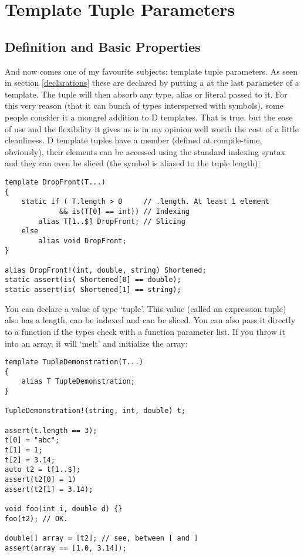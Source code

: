 \section{Template Tuple Parameters}\label{tuples}

\subsection{Definition and Basic Properties}\label{tupleproperties}

And now comes one of my favourite subjects: template tuple parameters. As seen in section \ref{declarations} these are declared by putting a  at the last parameter of a template. The tuple will then absorb any type, alias or literal passed to it. 
For this very reason (that it can bunch of types interspersed with symbols), some people consider it a mongrel addition to D templates. That is true, but the ease of use and the flexibility it gives us is in my opinion well worth the cost of a little cleanliness.
D template tuples have a  member (defined at compile-time, obviously), their elements can be accessed using the standard indexing syntax and they can even be sliced (the \DD{\$} symbol is aliased to the tuple length):

\begin{verbatim}
template DropFront(T...)
{
    static if ( T.length > 0     // .length. At least 1 element
             && is(T[0] == int)) // Indexing
        alias T[1..$] DropFront; // Slicing
    else
        alias void DropFront;
}

alias DropFront!(int, double, string) Shortened;
static assert(is( Shortened[0] == double);
static assert(is( Shortened[1] == string);
\end{verbatim}

You can declare a value of type `tuple'. This value (called an expression tuple) also has a length, can be indexed and can be sliced. You can also pass it directly to a function if the types check with a function parameter list. If you throw it into an array, it will `melt' and initialize the array:

\begin{verbatim}
template TupleDemonstration(T...)
{
    alias T TupleDemonstration; 
}

TupleDemonstration!(string, int, double) t;

assert(t.length == 3);
t[0] = "abc";
t[1] = 1;
t[2] = 3.14;
auto t2 = t[1..$];
assert(t2[0] = 1)
assert(t2[1] = 3.14);

void foo(int i, double d) {}
foo(t2); // OK.

double[] array = [t2]; // see, between [ and ]
assert(array == [1.0, 3.14]);
\end{verbatim}

